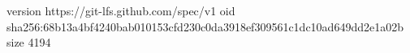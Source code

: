 version https://git-lfs.github.com/spec/v1
oid sha256:68b13a4bf4240bab010153cfd230c0da3918ef309561c1dc10ad649dd2e1a02b
size 4194
